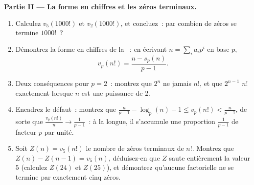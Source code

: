 \begin{problem}
\medskip
\noindent\textbf{Partie II --- La forme en chiffres et les zéros
terminaux.}
\begin{enumerate}[resume]
  \item Calculez $v_5(1000!)$ et $v_2(1000!)$, et concluez~: par combien
        de zéros se termine $1000!$~?
  \item Démontrez la forme en chiffres de la ~: en écrivant $n =
        \sum_i a_i p^i$ en base $p$,
        \[
        v_p(n!) = \frac{n - s_p(n)}{p - 1} .
        \]
  \item Deux conséquences pour $p = 2$~: montrez que $2^n$ ne 
        jamais $n!$, et que $2^{n-1}$  $n!$ exactement lorsque
        $n$ est une puissance de $2$.
  \item Encadrez le défaut~: montrez que $\frac n{p-1} - \log_p(n) - 1 \leq
        v_p(n!) < \frac n{p-1}$, de sorte que $\frac{v_p(n!)}{n} \to
        \frac1{p-1}$~: à la longue, il s'accumule une proportion
        $\frac1{p-1}$ de facteur $p$ par unité.
  \item Soit $Z(n) = v_5(n!)$ le nombre de zéros terminaux de
        $n!$. Montrez que $Z(n) - Z(n-1) = v_5(n)$, déduisez-en que $Z$ saute
        entièrement la valeur $5$ (calculez $Z(24)$ et $Z(25)$), et
        démontrez qu'aucune factorielle ne se termine par exactement cinq zéros.
\end{enumerate}


\end{problem}
